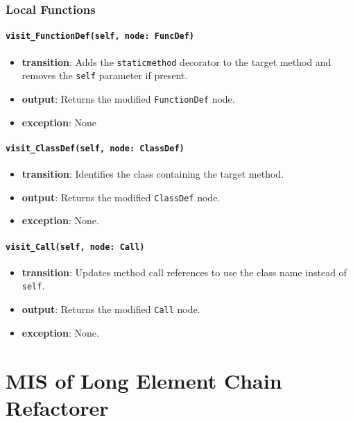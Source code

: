 \documentclass[12pt, titlepage]{article}
\begin{document}
\subsubsection{Local Functions}
\paragraph{\texttt{visit\_FunctionDef(self, node: FuncDef)}}
\begin{itemize}
  \item \textbf{transition}: Adds the \texttt{staticmethod} decorator to the target method and removes the \texttt{self} parameter if present.
  \item \textbf{output}: Returns the modified \texttt{FunctionDef} node.
  \item \textbf{exception}: None
\end{itemize}

\paragraph{\texttt{visit\_ClassDef(self, node: ClassDef)}}
\begin{itemize}
  \item \textbf{transition}: Identifies the class containing the target method.
  \item \textbf{output}: Returns the modified \texttt{ClassDef} node.
  \item \textbf{exception}: None.
\end{itemize}

\paragraph{\texttt{visit\_Call(self, node: Call)}}
\begin{itemize}
  \item \textbf{transition}: Updates method call references to use the class name instead of \texttt{self}.
  \item \textbf{output}: Returns the modified \texttt{Call} node.
  \item \textbf{exception}: None.
\end{itemize}
  
\newpage  


\section{MIS of Long Element Chain Refactorer} \label{mis:lec}
\end{document}
